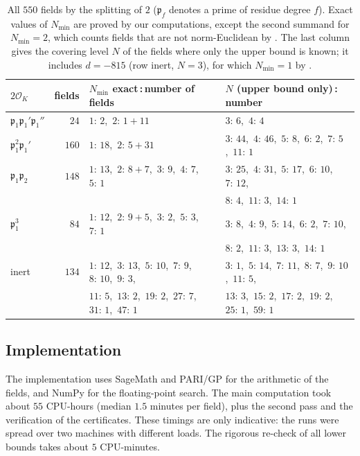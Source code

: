 \documentclass[11pt]{amsart}
\theoremstyle{definition}
\theoremstyle{remark}
\numberwithin{equation}{section}
\newcommand{\cO}{\mathcal{O}}
\newcommand{\Nmin}{N_{\min}}
\begin{document}
\begin{table}[ht]
\centering\small
\begin{tabular}{lrll}
\toprule
$2\cO_K$ & fields & $\Nmin$ exact\,:\,number of fields & $N$ (upper bound only)\,:\,number\\
\midrule
$\mathfrak p_1\mathfrak p_1'\mathfrak p_1''$ & $24$ & $1{:}\,2$,\ $2{:}\,1{+}11$ & $3{:}\,6$,\ $4{:}\,4$\\
$\mathfrak p_1^2\mathfrak p_1'$ & $160$ & $1{:}\,18$,\ $2{:}\,5{+}31$ & $3{:}\,44$,\ $4{:}\,46$,\ $5{:}\,8$,\ $6{:}\,2$,\ $7{:}\,5$,\ $11{:}\,1$\\
$\mathfrak p_1\mathfrak p_2$ & $148$ & $1{:}\,13$,\ $2{:}\,8{+}7$,\ $3{:}\,9$,\ $4{:}\,7$,\ $5{:}\,1$ & $3{:}\,25$,\ $4{:}\,31$,\ $5{:}\,17$,\ $6{:}\,10$,\ $7{:}\,12$,\\
 & & & $8{:}\,4$,\ $11{:}\,3$,\ $14{:}\,1$\\
$\mathfrak p_1^3$ & $84$ & $1{:}\,12$,\ $2{:}\,9{+}5$,\ $3{:}\,2$,\ $5{:}\,3$,\ $7{:}\,1$ & $3{:}\,8$,\ $4{:}\,9$,\ $5{:}\,14$,\ $6{:}\,2$,\ $7{:}\,10$,\\
 & & & $8{:}\,2$,\ $11{:}\,3$,\ $13{:}\,3$,\ $14{:}\,1$\\
inert & $134$ & $1{:}\,12$,\ $3{:}\,13$,\ $5{:}\,10$,\ $7{:}\,9$,\ $8{:}\,10$,\ $9{:}\,3$, & $3{:}\,1$,\ $5{:}\,14$,\ $7{:}\,11$,\ $8{:}\,7$,\ $9{:}\,10$,\ $11{:}\,5$,\\
 & & $11{:}\,5$,\ $13{:}\,2$,\ $19{:}\,2$,\ $27{:}\,7$,\ $31{:}\,1$,\ $47{:}\,1$ & $13{:}\,3$,\ $15{:}\,2$,\ $17{:}\,2$,\ $19{:}\,2$,\ $25{:}\,1$,\ $59{:}\,1$\\
\bottomrule
\end{tabular}
\caption{All $550$ fields by the splitting of $2$ ($\mathfrak p_f$ denotes a prime of residue
degree $f$). Exact values of $\Nmin$ are proved by our computations, except the second summand
for $\Nmin=2$, which counts fields that are not norm-Euclidean by \cite{BBT}. The last column
gives the covering level $N$ of the fields where only the upper bound is known; it includes
$d=-815$ (row inert, $N=3$), for which $\Nmin=1$ by \cite{CL,BBT}.}
\label{tab:split}
\end{table}

\subsection{Implementation}
The implementation uses SageMath \cite{Sage} and PARI/GP \cite{PARI} for the arithmetic of the
fields, and NumPy for the floating-point search. The main computation took about $55$ CPU-hours
(median $1.5$ minutes per field), plus the second pass and the verification of the certificates.
These timings are only indicative: the runs were spread over two machines with different loads.
The rigorous re-check of all lower bounds takes about $5$ CPU-minutes.
\end{document}
